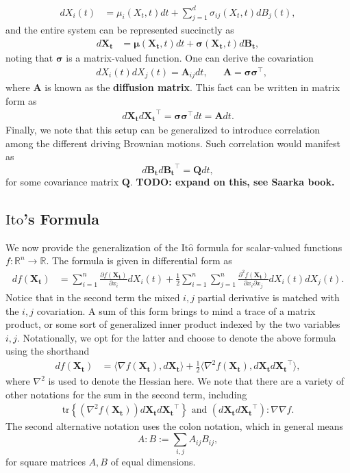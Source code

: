 \documentclass[12pt]{article}
\newcommand{\B}[1]{\boldsymbol{#1}}
\newcommand{\R}{\mathbb{R}}
\newcommand{\state}[1][t]{X_{#1}}
\newcommand{\BM}[1][t]{B_{#1}} %
\newcommand{\ito}{\text{It}\hat{\text{o}}}
\newcommand{\dimBM}{d} %
\newcommand{\dimState}{n}
\newcommand{\diffMat}{\mathbf{A}} %
\begin{document}
\begin{align*}
d\state[i](t) &= \mu_i(\state,t) dt + \sum_{j=1}^{\dimBM} \sigma_{ij}(\state,t) d\BM[j](t), 
\end{align*}
and the entire system can be represented succinctly as
\begin{align}
d\B\state &= \B\mu(\B\state,t) dt + \B\sigma(\B\state,t) d\B\BM, \label{SDE_multidim}
\end{align}
noting that $\B\sigma$ is a matrix-valued function. One can derive the covariation 
\begin{align*}
&d\state[i](t) d\state[j](t) = \diffMat_{ij} dt, &&\diffMat = \B\sigma \B\sigma^\top, 
\end{align*}
where $\diffMat$ is known as the \textbf{diffusion matrix}. This fact can be written in matrix form as 
\begin{align*}
d\B\state d\B\state^\top = \B\sigma\B\sigma^\top dt = \diffMat dt.
\end{align*}
Finally, we note that this setup can be generalized to introduce correlation among the different driving Brownian motions. Such correlation would manifest as 
\[
d\B\BM d\B\BM^\top = \B{Q} dt, 
\]
for some covariance matrix $\B{Q}$. \textbf{TODO: expand on this, see Saarka book.}

\subsection{$\ito$'s Formula}
We now provide the generalization of the $\ito$ formula for scalar-valued functions $f: \R^{\dimState} \to \R$. The formula is given in differential form as
\begin{align*}
df(\B\state) &= \sum_{i=1}^{\dimState} \frac{\partial f(\B\state)}{\partial x_i} d\state[i](t) + \frac{1}{2} \sum_{i=1}^{\dimState}\sum_{j=1}^{\dimState} \frac{\partial^2 f(\B\state)}{\partial x_i \partial x_j} d\state[i](t) d\state[j](t).
\end{align*}
Notice that in the second term the mixed $i,j$ partial derivative is matched with the $i,j$ covariation. A sum of this form brings to mind a trace of a matrix product, or some sort of generalized inner product indexed by the 
two variables $i,j$. Notationally, we opt for the latter and choose to denote the above formula using the shorthand 
\begin{align*}
df(\B\state) &= \langle \nabla f(\B\state), d\B\state \rangle + \frac{1}{2} \langle \nabla^2 f(\B\state), d\B\state d\B\state^\top  \rangle,
\end{align*}
where $\nabla^2$ is used to denote the Hessian here. We note that there are a variety of other notations for the sum in the second term, including 
\begin{align*}
\text{tr}\left\{(\nabla^2 f(\B\state)) d\B\state d\B\state^\top \right\} \text{ and } (d\B\state d\B\state^\top) : \nabla\nabla f.
\end{align*}
The second alternative notation uses the colon notation, which in general means 
\[
A:B := \sum_{i,j} A_{ij} B_{ij},
\]
for square matrices $A, B$ of equal dimensions. 
\end{document}
